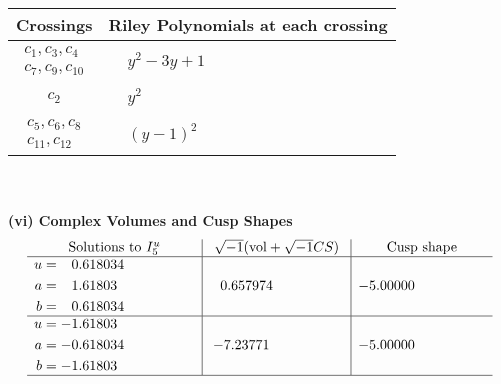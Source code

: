 \documentclass[1p]{elsarticle_modified}
\theoremstyle{definition}
\newcommand{\I}{\sqrt{-1}}
\begin{document}
\begin{tabular}{m{50pt}|m{274pt}}
Crossings & \hspace{64pt}Riley Polynomials at each crossing \\
\hline $$\begin{aligned}c_{1},c_{3},c_{4}\\c_{7},c_{9},c_{10}\end{aligned}$$&$\begin{aligned}
&y^2-3 y+1
\end{aligned}$\\
\hline $$\begin{aligned}c_{2}\end{aligned}$$&$\begin{aligned}
&y^2
\end{aligned}$\\
\hline $$\begin{aligned}c_{5},c_{6},c_{8}\\c_{11},c_{12}\end{aligned}$$&$\begin{aligned}
&(y-1)^2
\end{aligned}$\\
\hline
\end{tabular}\\~\\
\newpage\flushleft \textbf{(vi) Complex Volumes and Cusp Shapes}
$$\begin{array}{c|c|c}  
\text{Solutions to }I^u_{5}& \I (\text{vol} + \sqrt{-1}CS) & \text{Cusp shape}\\
 \hline 
\begin{aligned}
u &= \phantom{-}0.618034\phantom{ +0.000000I} \\
a &= \phantom{-}1.61803\phantom{ +0.000000I} \\
b &= \phantom{-}0.618034\phantom{ +0.000000I}\end{aligned}
 & \phantom{-}0.657974\phantom{ +0.000000I} & -5.00000\phantom{ +0.000000I} \\ \hline\begin{aligned}
u &= -1.61803\phantom{ +0.000000I} \\
a &= -0.618034\phantom{ +0.000000I} \\
b &= -1.61803\phantom{ +0.000000I}\end{aligned}
 & -7.23771\phantom{ +0.000000I} & -5.00000\phantom{ +0.000000I}\\
 \hline 
 \end{array}$$\newpage
\newpage\renewcommand{\arraystretch}{1}
\end{document}
